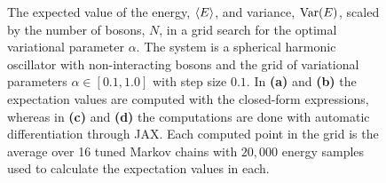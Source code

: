 \begin{figure}[!htb]
\centering
{}
\qquad
{}
\qquad
{}
\qquad
{}
\caption{The expected value of the energy, $\expval{E}$, and variance, $\mathrm{Var} \qty(E)$, scaled  by the number of bosons, $N$, in a grid search for the optimal variational parameter $\alpha$. The system is a spherical harmonic oscillator with non-interacting bosons and the grid of variational parameters $\alpha \in [0.1, 1.0]$ with step size $0.1$. In \textbf{(a)} and \textbf{(b)} the expectation values are computed with the closed-form expressions, whereas in \textbf{(c)} and \textbf{(d)} the computations are done with automatic differentiation through JAX. Each computed point in the grid is the average over 16 tuned Markov chains with $20,000$ energy samples used to calculate the expectation values in each.}
\label{fig:grid_search}
\end{figure}





